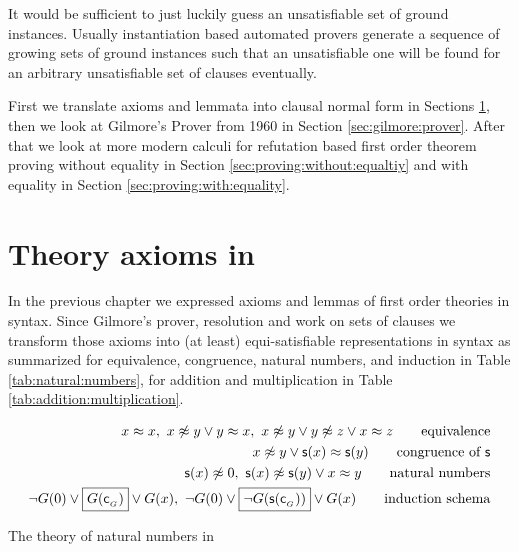 It would be sufficient to just luckily guess an unsatisfiable set of ground instances.
Usually instantiation based automated provers generate
a sequence of growing sets of ground instances
such that an unsatisfiable one will be found
for an arbitrary unsatisfiable set of clauses
eventually.

First we translate axioms and lemmata into clausal normal form in Sections \ref{sec:clausal:normal:form},
then we look at Gilmore's Prover from 1960 in Section \ref{sec:gilmore:prover}.
After that we look at more modern calculi for refutation based first order theorem proving
without equality in Section \ref{sec:proving:without:equaltiy} and with equality in Section \ref{sec:proving:with:equality}.


%
%
%

%
%

\section{Theory axioms in \CNF}\label{sec:clausal:normal:form}

In the previous chapter we expressed axioms and lemmas of first order theories in \FOF syntax.
Since Gilmore's prover, resolution and \InstGen work on sets of clauses we transform
those axioms into (at least) equi-satisfiable representations in \CNF syntax
as summarized for equivalence, congruence, natural numbers, and induction in Table \ref{tab:natural:numbers},
for addition and multiplication in Table \ref{tab:addition:multiplication}.

\begin{table}[hbt]
	\begin{align*}
	x\mEQ x,\
	x\mNE y\lor y\mEQ x,\
	x\mNE y\lor y\mNE z\lor x\mEQ z
	\tag*{equivalence}
	\\
	x\mNE y\lor \msucc(x)\mEQ\msucc(y)
	\tag*{congruence of $\msucc$}
	\\
	\msucc(x) \mNE 0,\
	\msucc(x) \mNE \msucc(y) \lor x \mEQ y
	\tag*{natural numbers}
	\\
	\lnot G(0) \lor \boxed{G(\mc_{_G})} \lor G(x),\
	\lnot G(0) \lor \boxed{\lnot G(\msucc(\mc_{_G}))} \lor G(x)
	\tag*{induction schema}
	\end{align*}
	\caption{The theory of natural numbers in \CNF}
	\label{tab:natural:numbers}
\end{table}

